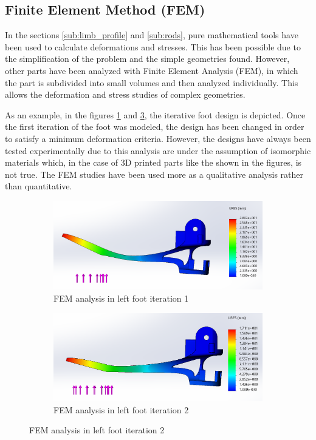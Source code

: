 
\subsection{Finite Element Method (FEM)} %
\label{sub:finite_element_method}
In the sections \ref{sub:limb_profile} and \ref{sub:rods}, pure mathematical tools have been used to calculate deformations and stresses.
This has been possible due to the simplification of the problem and the simple geometries found.
However, other parts have been analyzed with Finite Element Analysis (FEM), in which the part is subdivided into small volumes and then analyzed individually.
This allows the deformation and stress studies of complex geometries.

As an example, in the figures \ref{fig:fem_foot_iteration_1} and \ref{fig:fem_foot_iteration_2}, the iterative foot design is depicted.
Once the first iteration of the foot was modeled, the design has been changed in order to satisfy a minimum deformation criteria.
However, the designs have always been tested experimentally due to this analysis are under the assumption of isomorphic materials which, in the case of 3D printed parts like the shown in the figures, is not true.
The FEM studies have been used more as a qualitative analysis rather than quantitative.

\begin{figure}[ht]
    \centering
    \begin{subfigure}[b]{0.49\textwidth}
        \includegraphics[width=\textwidth]{figures/fem_5N_1.PNG}
        \caption{FEM analysis in left foot iteration 1}
        \label{fig:fem_foot_iteration_1}
    \end{subfigure}
    \begin{subfigure}[b]{0.49\textwidth}
        \includegraphics[width=\textwidth]{figures/fem_5N_2.PNG}
        \caption{FEM analysis in left foot iteration 2}
        \label{fig:fem_foot_iteration_2}
    \end{subfigure}
\end{figure}

